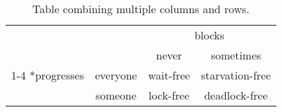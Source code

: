 \begin{table}[H]
	\centering
	\caption{Table combining multiple columns and rows.}
	\label{tab:multi}
	\setlength{\arrayrulewidth}{0.4mm}
	\begin{tabular}{cc|cc}
	                          &          & \multicolumn{2}{c}{blocks} \\
	                          &          & never     & sometimes      \\
	\cline{1-4}
	\multirow{2}*{progresses} & everyone & wait-free & starvation-free \\
	                          & someone  & lock-free & deadlock-free   \\
	\end{tabular}
\end{table}

